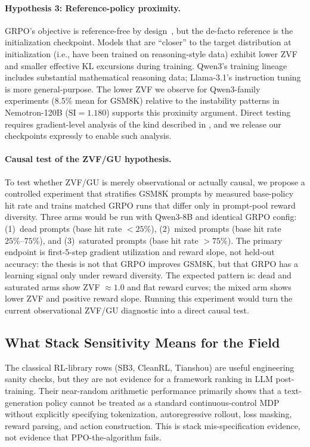 \paragraph{Hypothesis 3: Reference-policy proximity.}
GRPO's objective is reference-free by design~\citep{shao2024deepseekmath},
but the de-facto reference is the initialization checkpoint.
Models that are ``closer'' to the target distribution at initialization (i.e.,
have been trained on reasoning-style data) exhibit lower ZVF and smaller
effective KL excursions during training.
Qwen3's training lineage includes substantial mathematical reasoning data;
Llama-3.1's instruction tuning is more general-purpose.
The lower ZVF we observe for Qwen3-family experiments ($8.5\%$ mean for GSM8K)
relative to the instability patterns in Nemotron-120B ($\text{SI} = 1.180$)
supports this proximity argument.
Direct testing requires gradient-level analysis of the kind described in
\citet{liu2025rlsubnetworks}, and we release our checkpoints expressly to
enable such analysis.

\paragraph{Causal test of the ZVF/GU hypothesis.}
To test whether ZVF/GU is merely observational or actually causal, we propose
a controlled experiment that stratifies GSM8K prompts by measured base-policy
hit rate and trains matched GRPO runs that differ only in prompt-pool reward
diversity.  Three arms would be run with Qwen3-8B and identical GRPO config:
(1)~dead prompts (base hit rate $<25\%$), (2)~mixed prompts (base hit rate
$25\%\text{--}75\%$), and (3)~saturated prompts (base hit rate $>75\%$).
The primary endpoint is first-5-step gradient utilization and reward slope,
not held-out accuracy: the thesis is not that GRPO improves GSM8K, but that
GRPO has a learning signal only under reward diversity.  The expected pattern
is: dead and saturated arms show ZVF $\approx 1.0$ and flat reward curves;
the mixed arm shows lower ZVF and positive reward slope.  Running this
experiment would turn the current observational ZVF/GU diagnostic into a
direct causal test.

\subsection{What Stack Sensitivity Means for the Field}
\label{sec:discuss_impl}

The classical RL-library rows (SB3, CleanRL, Tianshou) are useful engineering
sanity checks, but they are not evidence for a framework ranking in LLM
post-training.  Their near-random arithmetic performance primarily shows that
a text-generation policy cannot be treated as a standard continuous-control
MDP without explicitly specifying tokenization, autoregressive rollout,
loss masking, reward parsing, and action construction.  This is stack
mis-specification evidence, not evidence that PPO-the-algorithm fails.

